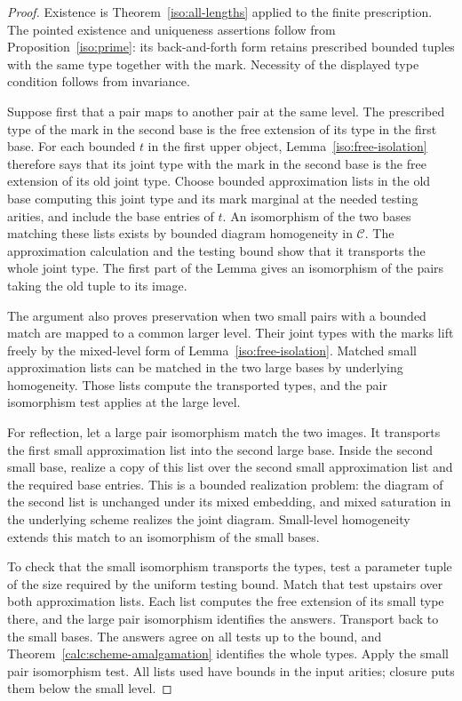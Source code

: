 \begin{proof}
Existence is Theorem~\ref{iso:all-lengths} applied to the finite
prescription.  The pointed existence and uniqueness assertions follow
from Proposition~\ref{iso:prime}: its back-and-forth form retains prescribed
bounded tuples with the same type together with the mark.  Necessity
of the displayed type condition follows from invariance.

Suppose first that a pair maps to another pair at the same level.
The prescribed type of the mark in the second base is the free
extension of its type in the first base.  For each bounded \(t\) in
the first upper object, Lemma~\ref{iso:free-isolation} therefore says
that its joint type with the mark in the second base is the free
extension of its old joint type.  Choose bounded approximation lists
in the old base computing this joint type and its mark marginal at
the needed testing arities, and include the base entries of \(t\).
An isomorphism of the two bases matching these lists exists by bounded
diagram homogeneity in \(\mathcal C\).  The approximation calculation
and the testing bound show that it transports the whole joint type.
The first part of the Lemma gives an isomorphism of the pairs taking
the old tuple to its image.

The argument also proves preservation when two small pairs with a
bounded match are mapped to a common larger level.  Their joint
types with the marks lift freely by the mixed-level form of
Lemma~\ref{iso:free-isolation}.  Matched small approximation lists
can be matched in the two large bases by underlying homogeneity.
Those lists compute the transported types, and the pair isomorphism
test applies at the large level.

For reflection, let a large pair isomorphism match the two images.
It transports the first small approximation list into the second
large base.  Inside the second small base, realize a copy of this list
over the second small approximation list and the required base
entries.  This is a bounded realization problem: the diagram of the
second list is unchanged under its mixed embedding, and mixed
saturation in the underlying scheme realizes the joint diagram.
Small-level homogeneity extends this match to an isomorphism of the
small bases.

To check that the small isomorphism transports the types, test a
parameter tuple of the size required by the uniform testing bound.
Match that test upstairs over both approximation lists.  Each
list computes the free extension of its small type there, and the
large pair isomorphism identifies the answers.  Transport back to
the small bases.  The answers agree on all tests up to the bound, and
Theorem~\ref{calc:scheme-amalgamation} identifies the whole types.  Apply the small
pair isomorphism test.  All lists used have bounds in the input
arities; closure puts them below the small level.
\end{proof}

